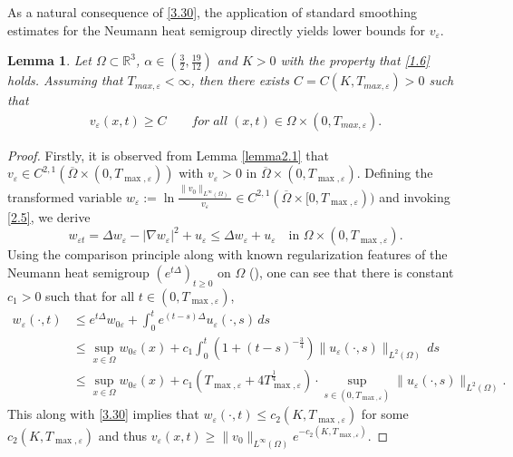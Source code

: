 \documentclass[12pt]{article}
\theoremstyle{plain}
\newtheorem{lemma}{Lemma}[section]
\theoremstyle{definition}
\numberwithin{equation}{section}
\begin{document}
As a natural consequence of \eqref{3.30}, the application of standard smoothing estimates for the Neumann heat semigroup directly yields lower bounds for $v_{\varepsilon}$.
\begin{lemma}\label{lemma3.9}
Let $\Omega \subset \mathbb R^3$, $\alpha\in(\frac{3}{2},\frac{19}{12})$ and $K>0$ with the property that \eqref{1.6} holds. Assuming that $T_{max,\varepsilon}<\infty$,  then
there exists  $C=C( K,T_{max,\varepsilon})>0$ such that
\begin{align}\label{3.40}
   v_{\varepsilon}(x,t)\geq C\qquad for\; all\; (x,t)\in \Omega\times(0,T_{max,\varepsilon}).
\end{align}
\end{lemma}
\begin{proof}
   Firstly, it is  observed from Lemma \ref{lemma2.1} that $ v_\varepsilon \in C^{2,1}(\overline{\Omega} \times (0, T_{\max,\varepsilon})) $ with $v_\varepsilon>0$ in $\overline{\Omega} \times (0, T_{\max,\varepsilon})$. Defining the transformed variable $w_\varepsilon := \ln \frac{\|v_0\|_{L^\infty(\Omega)}}{v_\varepsilon} \in  C^{2,1}(\overline{\Omega} \times [0, T_{\max,\varepsilon}))$  and invoking \eqref{2.5}, we derive
$$w_{\varepsilon t} = \Delta w_\varepsilon - |\nabla w_\varepsilon|^2 + u_\varepsilon \leq \Delta w_\varepsilon + u_\varepsilon \quad \text{in } \Omega \times (0, T_{\max,\varepsilon}).$$
Using the comparison principle along with known regularization features of the Neumann heat semigroup $(e^{t\Delta})_{t \geq 0}$ on
 $ \Omega $ (\cite{Winkler4}),  one can see that there is
  constant $c_1> 0 $ such that  for all  $ t \in (0, T_{\max,\varepsilon})$,
\begin{align*}
w_\varepsilon (\cdot, t) &\leq e^{t\Delta}  w_{0\varepsilon} + \int_{0}^t e^{(t-s)\Delta} u_\varepsilon (\cdot, s) \, ds \\
&\leq \sup_{x \in \Omega} w_{0\varepsilon}(x) + c_1 \int_{0}^t (1+(t-s)^{-\frac{3}{4}} ) \|u_\varepsilon (\cdot, s)\|_{L^2(\Omega)} \, ds \\
&\leq \sup_{x \in \Omega}  w_{0\varepsilon}(x)  + c_1(T_{\max,\varepsilon}+ 4T^{\frac14}_{\max,\varepsilon})\cdot \sup_{s \in (0, T_{\max,\varepsilon})} \|u_\varepsilon (\cdot, s)\|_{L^2(\Omega)}.
\end{align*}
 This along with   \eqref{3.30} implies that  $w_\varepsilon (\cdot, t)\leq c_2(K,T_{\max,\varepsilon})$ for some $c_2(K,T_{\max,\varepsilon})$
  and thus $v_{\varepsilon}(x,t)\geq \|v_0\|_{L^\infty(\Omega)} e^{-c_2(K,T_{\max,\varepsilon})}$.
\end{proof}
\end{document}
